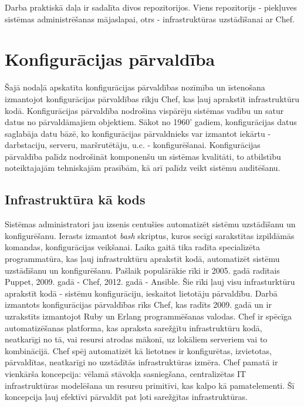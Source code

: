 Darba praktiskā daļa ir sadalīta divos repozitorijos. Viens repozitorijs - piekļuves sistēmas administrēšanas mājaslapai, otrs - infrastruktūras uzstādīšanai ar Chef.

\chapter{Konfigurācijas pārvaldība}
Šajā nodaļā apskatīta konfigurācijas pārvaldības nozīmība un īstenošana izmantojot konfigurācijas pārvaldības rīkju Chef, kas ļauj aprakstīt infrastruktūru kodā.
Konfigurācijas pārvaldība nodrošina vispārēju sistēmas vadību un satur datus no pārvaldāmajiem objektiem. Sākot no 1960' gadiem, konfigurācijas datus saglabāja datu bāzē, ko konfigurācijas pārvaldnieks var izmantot iekārtu - darbstaciju, serveru, maršrutētāju, u.c. - konfigurēšanai.
Konfigurācijas pārvaldība palīdz nodrošināt komponenšu un sistēmas kvalitāti, to atbilstību noteiktajajām tehniskajām prasībām, kā arī palīdz veikt sistēmu auditēšanu.

\section{Infrastruktūra kā kods}
Sistēmas administratori jau izsenis centušies automatizēt sistēmu uzstādīšanu un konfigurēšanu. Ierasts izmantot \textit{bash} skriptus, kuros secīgi sarakstītas izpildāmās komandas, konfigurācijas veikšanai. Laika gaitā tika radīta specializēta programmatūra, kas ļauj infrastruktūru aprakstīt kodā, automatizēt sistēmu uzstādīšanu un konfigurēšanu. Pašlaik populārākie rīki ir 2005. gadā radītais Puppet, 2009. gadā - Chef, 2012. gadā - Ansible. Šie rīki ļauj visu infrasturktūru aprakstīt kodā - sistēmu konfigurāciju, ieskaitot lietotāju pārvaldību. Darbā izmantots konfigurācijas pārvaldības rīks Chef, kas radīts 2009. gadā un ir uzrakstīts izmantojot Ruby un Erlang programmēšanas valodas.
Chef ir spēcīga automatizēšanas platforma, kas apraksta sarežģītu infrastruktūru kodā, neatkarīgi no tā, vai resursi atrodas mākonī, uz lokāliem serveriem vai to kombinācijā. Chef spēj automatizēt kā lietotnes ir konfigurētas, izvietotas, pārvaldītas, neatkarīgi no uzstādītās infrastruktūras izmēra. \cite{chef-docs}
Chef pamatā ir vienkārša koncepcija: vēlamā stāvokļa sasniegšana, centralizētas IT infrastruktūras modelēšana un resursu primitīvi, kas kalpo kā pamatelementi. Šī koncepcija ļauj efektīvi pārvaldīt pat ļoti sarežģītas infrastruktūras.
